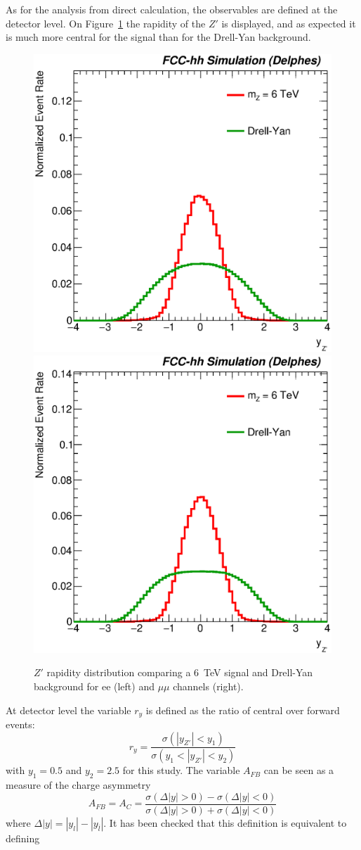 As for the analysis from direct calculation, the observables are defined at the detector level. On Figure~\ref{figure:lepana:yzp} the 
rapidity of the $Z'$ is displayed, and as expected it is much more central for the signal than for the Drell-Yan background.
\begin{figure}[!htb]
  \centering
  \includegraphics[width=0.45\columnwidth]{Fig/27tev/yzp_sel0_lin_norm_ee.eps}
  \includegraphics[width=0.45\columnwidth]{Fig/27tev/yzp_sel0_lin_norm_mumu.eps}
  \caption{$Z'$ rapidity distribution comparing a 6~TeV signal and Drell-Yan background for ee (left) and $\mu\mu$ channels (right).}
  \label{figure:lepana:yzp}
\end{figure}
At detector level the variable $r_y$ is defined as the ratio of central over forward events:
\begin{equation}
r_y = \frac{\sigma(|y_{Z'}| < y_1)}{\sigma(y_1 < |y_{Z'}| <y_2)}
\end{equation}
with $y_1=0.5$ and $y_2=2.5$ for this study.
\newline
The variable $A_{FB}$ can be seen as a measure of the charge asymmetry
\begin{equation}
A_{FB} = A_C =  \frac{\sigma(\Delta|y| > 0) - \sigma(\Delta|y| < 0)}{\sigma(\Delta|y| > 0) + \sigma(\Delta|y| < 0)}
\end{equation}
where $\Delta|y| = |y_l| - |y_{\bar{l}}|$. It has been checked that this definition is equivalent to defining 
